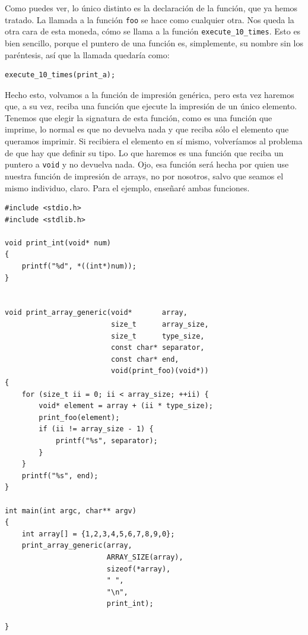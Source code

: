 \documentclass[a4paper]{article}
\begin{document}
Como puedes ver, lo único distinto es la declaración de la función, que ya
hemos tratado. La llamada a la función \verb!foo! se hace como cualquier otra.
Nos queda la otra cara de esta moneda, cómo se llama a la función
\verb!execute_10_times!. Esto es bien sencillo, porque el puntero de una función
es, simplemente, su nombre sin los paréntesis, así que la llamada quedaría como:

\noindent
\begin{minipage}[H]{\linewidth}
\begin{lstlisting}[style=C, label={lst:foocall},
caption={Llamada a una función que recibe un puntero a función}]
execute_10_times(print_a);
\end{lstlisting}
\end{minipage}

Hecho esto, volvamos a la función de impresión genérica, pero esta vez haremos
que, a su vez, reciba una función que ejecute la impresión de un único elemento.
Tenemos que elegir la signatura de esta función, como es una función que
imprime, lo normal es que no devuelva nada y que reciba sólo el elemento
que queramos imprimir. Si recibiera el elemento en sí mismo, volveríamos
al problema de que hay que definir su tipo. Lo que haremos es una función
que reciba un puntero a \verb!void! y no devuelva nada. Ojo, esa función será
hecha por quien use nuestra función de impresión de arrays, no por nosotros,
salvo que seamos el mismo individuo, claro. Para el ejemplo, enseñaré ambas
funciones.


\noindent
\begin{minipage}[H]{\linewidth}
\mbox{}
\begin{lstlisting}[style=C,
caption={Definición de función de impresión genérica},
label={lst:printArrayGeneric2}]
#include <stdio.h>
#include <stdlib.h>

void print_int(void* num)
{
    printf("%d", *((int*)num));
}


void print_array_generic(void*       array,
                         size_t      array_size,
                         size_t      type_size,
                         const char* separator,
                         const char* end,
                         void(print_foo)(void*))
{
    for (size_t ii = 0; ii < array_size; ++ii) {
        void* element = array + (ii * type_size);
        print_foo(element);
        if (ii != array_size - 1) {
            printf("%s", separator);
        }
    }
    printf("%s", end);
}

int main(int argc, char** argv)
{
    int array[] = {1,2,3,4,5,6,7,8,9,0};
    print_array_generic(array,
                        ARRAY_SIZE(array),
                        sizeof(*array),
                        " ",
                        "\n",
                        print_int);

}
\end{lstlisting}
\end{minipage}
\end{document}
